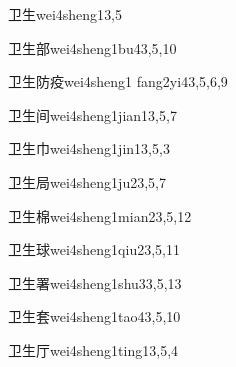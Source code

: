 \begin{verbete}{卫生}{wei4sheng1}{3,5}
\end{verbete}

\begin{verbete}{卫生部}{wei4sheng1bu4}{3,5,10}
\end{verbete}

\begin{verbete}{卫生防疫}{wei4sheng1 fang2yi4}{3,5,6,9}
\end{verbete}

\begin{verbete}{卫生间}{wei4sheng1jian1}{3,5,7}
\end{verbete}

\begin{verbete}{卫生巾}{wei4sheng1jin1}{3,5,3}
\end{verbete}

\begin{verbete}{卫生局}{wei4sheng1ju2}{3,5,7}
\end{verbete}

\begin{verbete}{卫生棉}{wei4sheng1mian2}{3,5,12}
\end{verbete}

\begin{verbete}{卫生球}{wei4sheng1qiu2}{3,5,11}
\end{verbete}

\begin{verbete}{卫生署}{wei4sheng1shu3}{3,5,13}
\end{verbete}

\begin{verbete}{卫生套}{wei4sheng1tao4}{3,5,10}
\end{verbete}

\begin{verbete}{卫生厅}{wei4sheng1ting1}{3,5,4}
\end{verbete}


